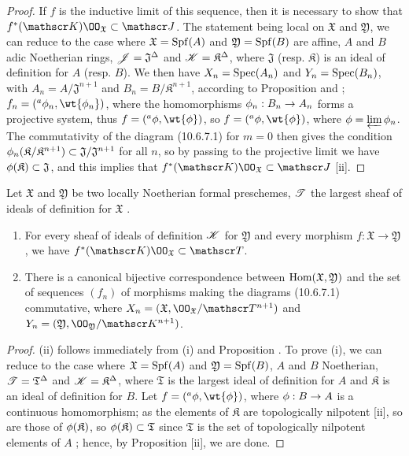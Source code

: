 \begin{proof}
\label{proof-1.10.6.9}
If $f$ is the inductive limit of this sequence, then it is necessary to show that $f^*(\sh{K})\OO_\mathfrak{X}\subset\sh{J}$.
The statement being local on $\mathfrak{X}$ and $\mathfrak{Y}$, we can reduce to the case where $\mathfrak{X}=\operatorname{Spf}(A)$ and $\mathfrak{Y}=\operatorname{Spf}(B)$ are affine, $A$ and $B$ adic Noetherian rings, $\mathscr{J}=\mathfrak{J}^\Delta$ and $\mathscr{K}=\mathfrak{K}^\Delta$, where $\mathfrak{J}$ (resp. $\mathfrak{K}$) is an ideal of definition for $A$ (resp. $B$).
We then have $X_n=\operatorname{Spec}(A_n)$ and $Y_n=\operatorname{Spec}(B_n)$, with $A_n=A/\mathfrak{J}^{n+1}$ and $B_n=B/\mathfrak{K}^{n+1}$, according to Proposition  and ; $f_n=({}^a\vphi_n,\wt{\vphi_n})$, where the homomorphisms $\vphi_n:B_n\to A_n$ forms a projective system, thus $f=({}^a\vphi,\wt{\vphi})$, so $f=({}^a\vphi,\wt{\vphi})$, where $\phi=\varprojlim\phi_n$.
The commutativity of the diagram (10.6.7.1) for $m=0$ then gives the condition $\phi_n(\mathfrak{K}/\mathfrak{K}^{n+1})\subset\mathfrak{J}/\mathfrak{J}^{n+1}$ for all $n$, so by passing to the projective limit we have $\phi(\mathfrak{K})\subset\mathfrak{J}$, and this implies that $f^*(\sh{K})\OO_\mathfrak{X}\subset\sh{J}$ [ii].
\end{proof}

\begin{cor}[10.6.10]
\label{1.10.6.10}
Let $\mathfrak{X}$ and $\mathfrak{Y}$ be two locally Noetherian formal preschemes, $\mathscr{T}$ the largest sheaf of ideals of definition for $\mathfrak{X}$ .
\begin{enumerate}[label=\emph{(\roman*)}]
  \item For every sheaf of ideals of definition $\mathscr{K}$ for $\mathfrak{Y}$ and every morphism $f:\mathfrak{X}\to\mathfrak{Y}$, we have $f^*(\sh{K})\OO_\mathfrak{X}\subset\sh{T}$.
  \item There is a canonical bijective correspondence between $\operatorname{Hom}(\mathfrak{X},\mathfrak{Y})$ and the set of sequences $(f_n)$ of morphisms making the diagrams (10.6.7.1) commutative, where $X_n=(\mathfrak{X},\OO_\mathfrak{X}/\sh{T}^{n+1})$ and $Y_n=(\mathfrak{Y},\OO_\mathfrak{Y}/\sh{K}^{n+1})$.
\end{enumerate}
\end{cor}

\begin{proof}
\label{proof-1.10.6.10}
(ii) follows immediately from (i) and Proposition .
To prove (i), we can reduce to the case where $\mathfrak{X}=\operatorname{Spf}(A)$ and $\mathfrak{Y}=\operatorname{Spf}(B)$, $A$ and $B$ Noetherian, $\mathscr{T}=\mathfrak{T}^\Delta$ and $\mathscr{K}=\mathfrak{K}^\Delta$, where $\mathfrak{T}$ is the largest ideal of definition for $A$ and $\mathfrak{K}$ is an ideal of definition for $B$.
Let $f=({}^a\vphi,\wt{\vphi})$, where $\vphi:B\to A$ is a continuous homomorphism; as the elements of $\mathfrak{K}$ are topologically nilpotent [ii], so are those of $\phi(\mathfrak{K})$, so $\phi(\mathfrak{K})\subset\mathfrak{T}$ since $\mathfrak{T}$ is the set of topologically nilpotent elements of $A$ ; hence, by Proposition [ii], we are done.
\end{proof}

